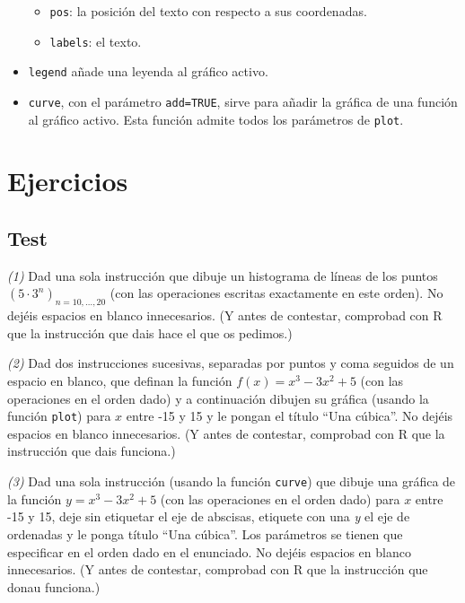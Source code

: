 \documentclass[]{book}
\providecommand{\tightlist}{%
  \setlength{\itemsep}{0pt}\setlength{\parskip}{0pt}}
\theoremstyle{definition}
\theoremstyle{definition}
\theoremstyle{definition}
\theoremstyle{remark}
\begin{document}
\begin{itemize}
  \begin{itemize}
  \tightlist
  \item
    \texttt{pos}: la posición del texto con respecto a sus coordenadas.
  \item
    \texttt{labels}: el texto.
  \end{itemize}
\item
  \texttt{legend} añade una leyenda al gráfico activo.
\item
  \texttt{curve}, con el parámetro \texttt{add=TRUE}, sirve para añadir la gráfica de una función al gráfico activo. Esta función admite todos los parámetros de \texttt{plot}.
\end{itemize}

\hypertarget{ejercicios-5}{%
\section{Ejercicios}\label{ejercicios-5}}

\hypertarget{test-4}{%
\subsection*{Test}\label{test-4}}

\emph{(1)} Dad una sola instrucción que dibuje un histograma de líneas de los puntos \((5\cdot 3^n)_{n=10,\ldots,20}\) (con las operaciones escritas exactamente en este orden). No dejéis espacios en blanco innecesarios. (Y antes de contestar, comprobad con R que la instrucción que dais hace el que os pedimos.)

\emph{(2)} Dad dos instrucciones sucesivas, separadas por puntos y coma seguidos de un espacio en blanco, que definan la función \(f(x)=x^3-3x^2+5\) (con las operaciones en el orden dado) y a continuación dibujen su gráfica (usando la función \texttt{plot}) para \(x\) entre -15 y 15 y le pongan el título ``Una cúbica''. No dejéis espacios en blanco innecesarios. (Y antes de contestar, comprobad con R que la instrucción que dais funciona.)

\emph{(3)} Dad una sola instrucción (usando la función \texttt{curve}) que dibuje una gráfica de la función \(y=x^3-3x^2+5\) (con las operaciones en el orden dado) para \(x\) entre -15 y 15, deje sin etiquetar el eje de abscisas, etiquete con una \emph{y} el eje de ordenadas y le ponga título ``Una cúbica''. Los parámetros se tienen que especificar en el orden dado en el enunciado. No dejéis espacios en blanco innecesarios. (Y antes de contestar, comprobad con R que la instrucción que donau funciona.)
\end{document}
